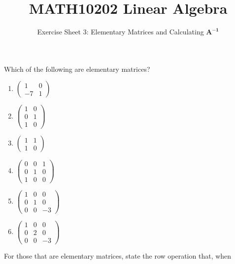 \documentclass[english,12pt,a4paper]{scrartcl}
\title{MATH10202 Linear Algebra}
\subtitle{Exercise Sheet 3: Elementary Matrices and Calculating $\bm{A^{-1}}$}
\author{}
\date{\vspace{-5ex}}
\newenvironment{modenumerate}
  {\enumerate\setupmodenumerate}
  {\endenumerate}
\newif\ifmoditem
\newcommand{\setupmodenumerate}{%
  \global\moditemfalse
  \let\origmakelabel\makelabel
  \def\moditem##1{\global\moditemtrue\def\mesymbol{##1}\item}%
  \def\makelabel##1{%
  \origmakelabel{##1\ifmoditem\rlap{\mesymbol}\fi\enspace}%
\global\moditemfalse}%
}
\begin{document}
\maketitle

\begin{modenumerate}
  \moditem{*} Which of the following are elementary matrices?
    \begin{multicols}{3}[\setlength{\columnseprule}{0pt}]
      \begin{enumerate}
        \item $
          \begin{pmatrix}
            1 & 0 \\
            -7 & 1
          \end{pmatrix}
          $
        \item $
          \begin{pmatrix}
            1 & 0 \\
            0 & 1 \\
            1 & 0
          \end{pmatrix}
          $
        \item $
          \begin{pmatrix}
            1 & 1 \\
            1 & 0
          \end{pmatrix}
          $
        \item $
          \begin{pmatrix}
            0 & 0 & 1 \\
            0 & 1 & 0 \\
            1 & 0 & 0
          \end{pmatrix}
          $
        \item $
          \begin{pmatrix}
            1 & 0 & 0 \\
            0 & 1 & 0 \\
            0 & 0 & -3
          \end{pmatrix}
          $
        \item $
          \begin{pmatrix}
            1 & 0 & 0 \\
            0 & 2 & 0 \\
            0 & 0 & -3
          \end{pmatrix}
          $
      \end{enumerate}
    \end{multicols}
    For those that are elementary matrices, state the row operation that, when 

\end{modenumerate}
\end{document}
